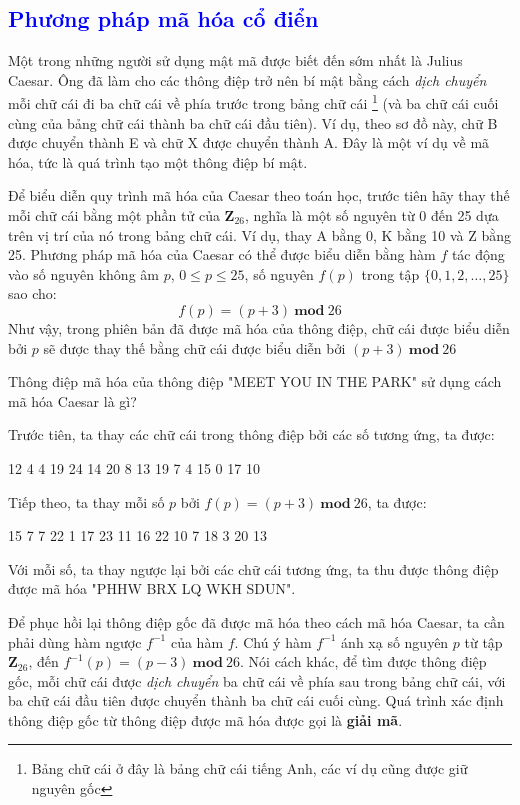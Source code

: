 \textcolor{blue}{\section{Phương pháp mã hóa cổ điển}}
Một trong những người sử dụng mật mã được biết đến sớm nhất là Julius Caesar. Ông đã làm cho các thông điệp trở nên bí mật bằng cách \textit{dịch chuyển} mỗi chữ cái đi ba chữ cái về phía trước trong bảng chữ cái \footnote{Bảng chữ cái ở đây là bảng chữ cái tiếng Anh, các ví dụ cũng được giữ nguyên gốc} (và ba chữ cái cuối cùng của bảng chữ cái thành ba chữ cái đầu tiên). Ví dụ, theo sơ đồ này, chữ B được chuyển thành E và chữ X được chuyển thành A. Đây là một ví dụ về mã hóa, tức là quá trình tạo một thông điệp bí mật.

Để biểu diễn quy trình mã hóa của Caesar theo toán học, trước tiên hãy thay thế mỗi chữ cái bằng một phần tử của $ \mathbf{Z}_{26} $, nghĩa là một số nguyên từ 0 đến 25 dựa trên vị trí của nó trong bảng chữ cái. Ví dụ, thay A bằng 0, K bằng 10 và Z bằng 25. Phương pháp mã hóa của Caesar có thể được biểu diễn bằng hàm $f$ tác động vào số nguyên không âm $p$, $0 \leq p \leq  25$, số nguyên $f(p)$ trong tập $\{0, 1, 2, \ldots, 25\}$ sao cho:
$$f(p) = (p+3)\ \mathbf{mod}\ 26$$
Như vậy, trong phiên bản đã được mã hóa của thông điệp, chữ cái được biểu diễn bởi $p$ sẽ được thay thế bằng chữ cái được biểu diễn bởi $(p+3)\ \mathbf{mod}\ 26$
\begin{example}
    Thông điệp mã hóa của thông điệp "MEET YOU IN THE PARK" sử dụng cách mã hóa Caesar là gì?
\end{example}
\begin{solution}
    Trước tiên, ta thay các chữ cái trong thông điệp bởi các số tương ứng, ta được:
    \begin{center}
        12 4 4 19 \hspace{0.5cm} 24 14 20 \hspace{0.5cm} 8 13 \hspace{0.5cm} 19 7 4 \hspace{0.5cm} 15 0 17 10
    \end{center}
    Tiếp theo, ta thay mỗi số $p$ bởi $f(p) = (p+3)\ \mathbf{mod}\ 26$, ta được:
    \begin{center}
        15 7 7 22 \hspace{0.5cm} 1 17 23 \hspace{0.5cm} 11 16 \hspace{0.5cm} 22 10 7 \hspace{0.5cm} 18 3 20 13
    \end{center}
    Với mỗi số, ta thay ngược lại bởi các chữ cái tương ứng, ta thu được thông điệp được mã hóa "PHHW BRX LQ WKH SDUN".
\end{solution}
Để phục hồi lại thông điệp gốc đã được mã hóa theo cách mã hóa Caesar, ta cần phải dùng hàm ngược $f^{-1}$ của hàm $f$. Chú ý hàm $f^{-1}$ ánh xạ số nguyên $p$ từ tập $ \mathbf{Z}_{26} $, đến $f^{-1}(p) = (p-3)\ \mathbf{mod}\ 26$. Nói cách khác, để tìm được thông điệp gốc, mỗi chữ cái được \textit{dịch chuyển} ba chữ cái về phía sau trong bảng chữ cái, với ba chữ cái đầu tiên được chuyển thành ba chữ cái cuối cùng. Quá trình xác định thông điệp gốc từ thông điệp được mã hóa được gọi là \textbf{giải mã}.

